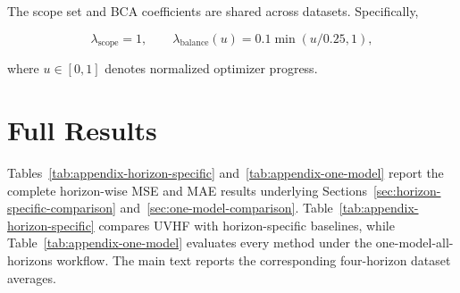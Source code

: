 \documentclass[final,3p,times]{elsarticle}
\newif\ifshowrevisions
\newcommand{\rev}[1]{\ifshowrevisions\textcolor{revisionblue}{#1}\else#1\fi}
\begin{document}
\begin{table}[t]
\centering
\scriptsize
\setlength{\tabcolsep}{4pt}
\caption{\rev{UVHF Configuration.}}
\label{tab:model-settings}
\end{table}


The scope set and \rev{BCA} coefficients are shared across datasets.
Specifically,

\[
\lambda_{\mathrm{scope}}=1,
\qquad
\lambda_{\mathrm{balance}}(u)
=
0.1\min(u/0.25,1),
\]

where $u\in[0,1]$ denotes normalized optimizer progress.

\setcounter{table}{0}
\setcounter{figure}{0}
\section{Full Results}
\label{app:full-results}


Tables~\ref{tab:appendix-horizon-specific} and~\ref{tab:appendix-one-model} report the complete horizon-wise MSE and MAE results underlying Sections~\ref{sec:horizon-specific-comparison} and~\ref{sec:one-model-comparison}. Table~\ref{tab:appendix-horizon-specific} compares \rev{UVHF} with horizon-specific baselines, while Table~\ref{tab:appendix-one-model} evaluates every method under the one-model-all-horizons workflow. The main text reports the corresponding four-horizon dataset averages.
\end{document}
